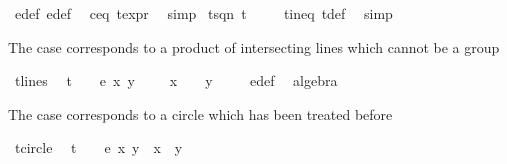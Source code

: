 \begin{isabellebody}
%
\isatagproof
{}\isamarkupfalse%
\ e{\isacharunderscore}def\ e{\isacharprime}{\isacharunderscore}def\ \isamarkupfalse%
\ c{\isacharunderscore}eq{\isacharunderscore}{}\ t{\isacharunderscore}expr{\isacharparenleft}{}{\isacharparenright}\ \isamarkupfalse%
\ simp%
\endisatagproof
{\isafoldproof}%
%
\isadelimproof
\isanewline
%
\endisadelimproof
\isanewline
{}\isamarkupfalse%
\ t{\isacharunderscore}sq{\isacharunderscore}n{}{\isacharcolon}\ {\isachardoublequoteopen}t{\isacharcircum}{}\ {\isasymnoteq}\ {}{\isachardoublequoteclose}%
\isadelimproof
\ %
\endisadelimproof
%
\isatagproof
{}\isamarkupfalse%
\ t{\isacharunderscore}ineq{\isacharparenleft}{}{\isacharparenright}\ t{\isacharunderscore}def\ \isamarkupfalse%
\ simp%
\endisatagproof
{\isafoldproof}%
%
\isadelimproof
%
\endisadelimproof
%
\begin{isamarkuptext}%
The case  corresponds to a product of intersecting lines which cannot be a group%
\end{isamarkuptext}\isamarkuptrue%
\isamarkupfalse%
\ t{\isacharunderscore}{}{\isacharunderscore}{}{\isacharunderscore}lines{\isacharcolon}\isanewline
\ \ {\isachardoublequoteopen}t{\isacharcircum}{}\ {\isacharequal}\ {}\ {\isasymLongrightarrow}\ e{\isacharprime}\ x\ y\ {\isacharequal}\ {\isacharminus}\ {\isacharparenleft}{}\ {\isacharminus}\ x{\isacharcircum}{}{\isacharparenright}\ {\isacharasterisk}\ {\isacharparenleft}{}\ {\isacharminus}\ y{\isacharcircum}{}{\isacharparenright}{\isachardoublequoteclose}\ \isanewline
%
\isadelimproof
\ \ %
\endisadelimproof
%
\isatagproof
{}\isamarkupfalse%
\ e{\isacharprime}{\isacharunderscore}def\ \isamarkupfalse%
\ algebra%
\endisatagproof
{\isafoldproof}%
%
\isadelimproof
%
\endisadelimproof
%
\begin{isamarkuptext}%
The case  corresponds to a circle which has been treated before%
\end{isamarkuptext}\isamarkuptrue%
\isamarkupfalse%
\ t{\isacharunderscore}{}{\isacharunderscore}circle{\isacharcolon}\isanewline
\ \ {\isachardoublequoteopen}t\ {\isacharequal}\ {}\ {\isasymLongrightarrow}\ e{\isacharprime}\ x\ y\ {\isacharequal}\ x{\isacharcircum}{}\ {\isacharplus}\ y{\isacharcircum}{}\ {\isacharminus}\ {}{\isachardoublequoteclose}\ \isanewline

\end{isabellebody}
